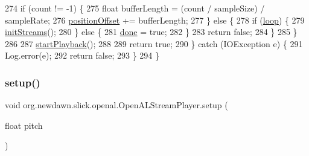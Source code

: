 \begin{DoxyCode}
274                 \textcolor{keywordflow}{if} (count != -1) \{
275                     \textcolor{keywordtype}{float} bufferLength = (count / sampleSize) / sampleRate;
276                     \mbox{\hyperlink{classorg_1_1newdawn_1_1slick_1_1openal_1_1_open_a_l_stream_player_a41556aeb2058a1c2dd04177e1d61d43c}{positionOffset}} += bufferLength;
277                 \} \textcolor{keywordflow}{else} \{
278                     \textcolor{keywordflow}{if} (\mbox{\hyperlink{classorg_1_1newdawn_1_1slick_1_1openal_1_1_open_a_l_stream_player_a377b3e28ef63fca0134898a07b086e7f}{loop}}) \{
279                         \mbox{\hyperlink{classorg_1_1newdawn_1_1slick_1_1openal_1_1_open_a_l_stream_player_a765f3c95de540350a0ed4902a6d9792a}{initStreams}}();
280                     \} \textcolor{keywordflow}{else} \{
281                         \mbox{\hyperlink{classorg_1_1newdawn_1_1slick_1_1openal_1_1_open_a_l_stream_player_a64962f56b4c366c19fe3c2bff2f55842}{done}} = \textcolor{keyword}{true};
282                     \}
283                     \textcolor{keywordflow}{return} \textcolor{keyword}{false};
284                 \}
285             \}
286 
287             \mbox{\hyperlink{classorg_1_1newdawn_1_1slick_1_1openal_1_1_open_a_l_stream_player_a42538934813aebc2b0b210953afc74d6}{startPlayback}}(); 
288 
289             \textcolor{keywordflow}{return} \textcolor{keyword}{true};
290         \} \textcolor{keywordflow}{catch} (IOException e) \{
291             Log.error(e);
292             \textcolor{keywordflow}{return} \textcolor{keyword}{false};
293         \}
294     \}
\end{DoxyCode}
\mbox{\label{classorg_1_1newdawn_1_1slick_1_1openal_1_1_open_a_l_stream_player_a7bfabcfeaa56d6561604d3936d9d1a51}} 
\subsubsection{\texorpdfstring{setup()}{setup()}}
{\footnotesize\ttfamily void org.\+newdawn.\+slick.\+openal.\+Open\+A\+L\+Stream\+Player.\+setup (\begin{DoxyParamCaption}\item[{float}]{pitch }\end{DoxyParamCaption})\hspace{0.3cm}{\ttfamily [inline]}}

